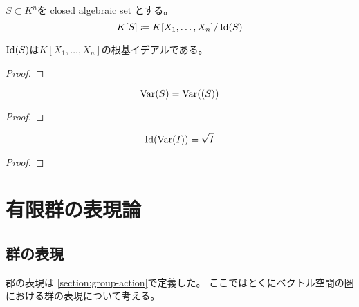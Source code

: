 \documentclass[report]{jlreq}
\begin{document}
\begin{definition}[座標環]
    $S \subset K^n$を closed algebraic set とする。
    \begin{equation}
        K[S] \coloneqq K[X_1, \dots, X_n] / \operatorname{Id}(S)
    \end{equation}
    \TODO{}
\end{definition}

\begin{lemma}
    $\operatorname{Id}(S)$は$K[X_1, \dots, X_n]$の根基イデアルである。
    \TODO{}
\end{lemma}

\begin{proof}
    \TODO{}
\end{proof}

\begin{lemma}
    \begin{equation}
        \operatorname{Var}(S) = \operatorname{Var}((S))
    \end{equation}
    \TODO{}
\end{lemma}

\begin{proof}
    \TODO{}
\end{proof}


\begin{theorem}
    \begin{equation}
        \operatorname{Id}(\operatorname{Var}(I)) = \sqrt{I}
    \end{equation}
    \TODO{}
\end{theorem}

\begin{proof}
    \TODO{}
\end{proof}




%
\chapter{有限群の表現論}

%
\section{群の表現}

郡の表現は
\cref{section:group-action}で定義した。
ここではとくにベクトル空間の圏における群の表現について考える。
\end{document}
